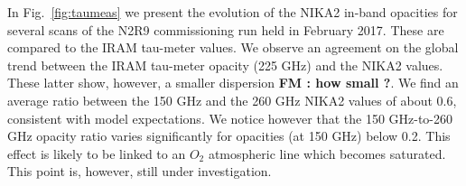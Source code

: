 In Fig.~\ref{fig:taumeas} we present the evolution of the NIKA2 in-band opacities for several
scans of the N2R9 commissioning run held in February 2017. These are
compared to the IRAM tau-meter values. We observe an agreement on the global trend between the IRAM tau-meter opacity
(225 GHz) and the NIKA2 values. These latter show, however,
a smaller dispersion {\bf FM : how small ?}. We find an average ratio between the
150 GHz and the 260 GHz NIKA2 values of about
0.6, consistent with model expectations. We notice however that
the 150 GHz-to-260 GHz opacity ratio varies significantly for
opacities (at 150 GHz) below 0.2. This effect is likely to be
linked to an $O_2$ atmospheric line which becomes saturated. This
point is, however, still under investigation.

